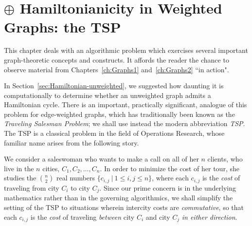 \chapter{$\oplus$ Hamiltonianicity in Weighted Graphs: the TSP}
\label{sec:TSP}

This chapter deals with an algorithmic problem which exercises several important graph-theoretic concepts and constructs.  It affords the reader the chance to observe material from Chapters~\ref{ch:Graphs1} and~\ref{ch:Graphs2} ``in action".

\medskip

In Section~\ref{sec:Hamiltonian-unweighted}, we suggested how daunting it is computationally to determine whether an unweighted graph admits a Hamiltonian cycle.  There is an important, practically significant, analogue of this problem for edge-weighted graphs, which has traditionally been known as the {\it Traveling Salesman Problem}; we shall use instead the modern abbreviation {\it TSP}.  The TSP is a classical problem in the field of Operations Research, whose familiar name arises from the following story.


\smallskip

We consider a saleswoman who wants to make a call on all of her $n$ clients, who live in the $n$ cities, $C_1, C_2, \ldots, C_n$.  In order to minimize the cost of her tour, she studies the
$\displaystyle {n \choose 2}$ real numbers $\{c_{i,j} \ | \ 1 \leq i,j \leq n\}$, where each $c_{i,j}$ is the {\it cost} of traveling from city $C_i$ to city $C_j$.  Since our prime concern is in the underlying mathematics rather than in the governing algorithmics, we shall simplify the setting of the TSP to situations wherein intercity costs are {\em commutative}, so that each  $c_{i,j}$ is the {\it cost} of traveling {\em between} city $C_i$ and city $C_j$ {\em in either direction}.

\bigskip

